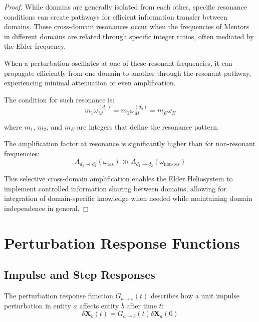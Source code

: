 \begin{proof}
While domains are generally isolated from each other, specific resonance conditions can create pathways for efficient information transfer between domains. These cross-domain resonances occur when the frequencies of Mentors in different domains are related through specific integer ratios, often mediated by the Elder frequency.

When a perturbation oscillates at one of these resonant frequencies, it can propagate efficiently from one domain to another through the resonant pathway, experiencing minimal attenuation or even amplification.

The condition for such resonance is:
\begin{equation}
m_1 \omega_{M}^{(d_1)} = m_2 \omega_{M}^{(d_2)} = m_E \omega_E
\end{equation}

where $m_1$, $m_2$, and $m_E$ are integers that define the resonance pattern.

The amplification factor at resonance is significantly higher than for non-resonant frequencies:
\begin{equation}
A_{d_1 \to d_2}(\omega_{\text{res}}) \gg A_{d_1 \to d_2}(\omega_{\text{non-res}})
\end{equation}

This selective cross-domain amplification enables the Elder Heliosystem to implement controlled information sharing between domains, allowing for integration of domain-specific knowledge when needed while maintaining domain independence in general.
\end{proof}

\section{Perturbation Response Functions}

\subsection{Impulse and Step Responses}

\begin{definition}
The perturbation response function $G_{a \to b}(t)$ describes how a unit impulse perturbation in entity $a$ affects entity $b$ after time $t$:
\begin{equation}
\delta\mathbf{X}_b(t) = G_{a \to b}(t) \delta\mathbf{X}_a(0)
\end{equation}
\end{definition}

